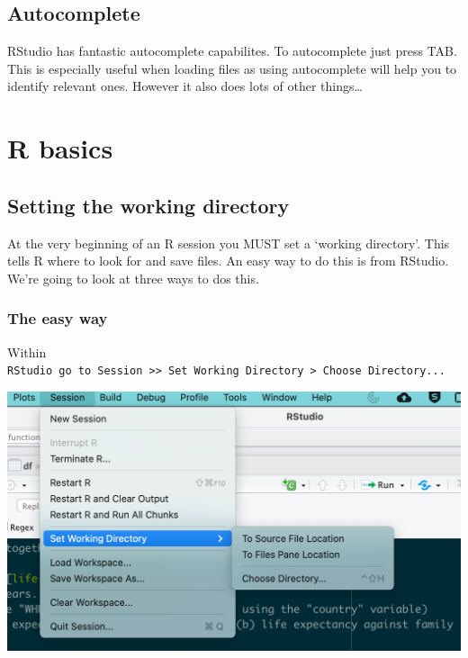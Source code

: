 \documentclass[]{article}
\begin{document}
\hypertarget{autocomplete}{%
\subsection{Autocomplete}\label{autocomplete}}

RStudio has fantastic autocomplete capabilites. To autocomplete just
press TAB. This is especially useful when loading files as using
autocomplete will help you to identify relevant ones. However it also
does lots of other things\ldots{}

\hypertarget{r-basics}{%
\section{R basics}\label{r-basics}}

\hypertarget{setting-the-working-directory}{%
\subsection{Setting the working
directory}\label{setting-the-working-directory}}

At the very beginning of an R session you MUST set a `working
directory'. This tells R where to look for and save files. An easy way
to do this is from RStudio. We're going to look at three ways to dos
this.

\hypertarget{the-easy-way}{%
\subsubsection{The easy way}\label{the-easy-way}}

Within
\texttt{RStudio\ go\ to\ Session\ \textgreater{}\textgreater{}\ Set\ Working\ Directory\ \textgreater{}\ Choose\ Directory...}

\includegraphics{setwd.png}
\end{document}
